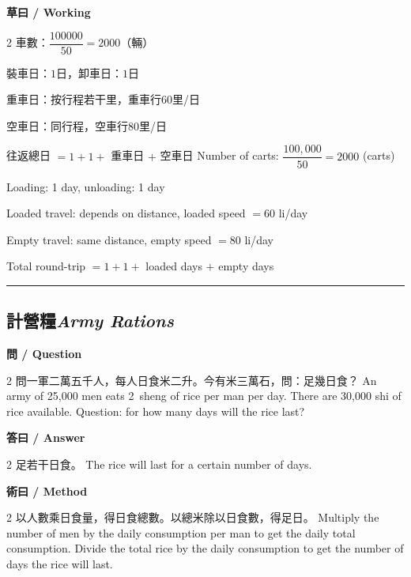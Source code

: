 \documentclass[11pt,a4paper]{article}
\newcommand{\bilingualsubsection}[2]{\subsection{#1\quad\textit{#2}}}
\newcommand{\longline}{\noindent\rule{\textwidth}{0.4pt}}
\begin{document}
\vspace{0.4em}
\noindent\textbf{\textcolor{chinesecolor}{草曰} / \textcolor{englishcolor}{Working}}
\vspace{0.2em}
\begin{paracol}{2}
車數：$\dfrac{100000}{50} = 2000$（輛）

裝車日：$1$日，卸車日：$1$日

重車日：按行程若干里，重車行$60$里/日

空車日：同行程，空車行$80$里/日

往返總日 $= 1 + 1 +$ 重車日 $+$ 空車日
\switchcolumn
Number of carts: $\dfrac{100{,}000}{50} = 2000$ (carts)

Loading: 1 day, unloading: 1 day

Loaded travel: depends on distance, loaded speed $= 60$ li/day

Empty travel: same distance, empty speed $= 80$ li/day

Total round-trip $= 1 + 1 +$ loaded days $+$ empty days
\end{paracol}

\vspace{0.5em}
\longline

\bilingualsubsection{計營糧}{Army Rations}

\vspace{0.4em}
\noindent\textbf{\textcolor{chinesecolor}{問} / \textcolor{englishcolor}{Question}}
\vspace{0.3em}
\begin{paracol}{2}
問一軍二萬五千人，每人日食米二升。今有米三萬石，問：足幾日食？
\switchcolumn
An army of 25{,}000 men eats 2~sheng of rice per man per day. There are
30{,}000 shi of rice available. Question: for how many days will the rice
last?
\end{paracol}

\vspace{0.4em}
\noindent\textbf{\textcolor{chinesecolor}{答曰} / \textcolor{englishcolor}{Answer}}
\vspace{0.2em}
\begin{paracol}{2}
足若干日食。
\switchcolumn
The rice will last for a certain number of days.
\end{paracol}

\vspace{0.4em}
\noindent\textbf{\textcolor{chinesecolor}{術曰} / \textcolor{englishcolor}{Method}}
\vspace{0.2em}
\begin{paracol}{2}
以人數乘日食量，得日食總數。以總米除以日食數，得足日。
\switchcolumn
Multiply the number of men by the daily consumption per man to get the daily
total consumption. Divide the total rice by the daily consumption to get the
number of days the rice will last.
\end{paracol}
\end{document}
